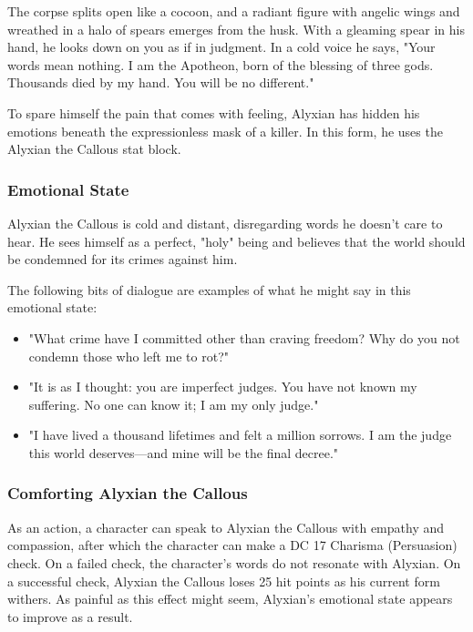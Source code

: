 \documentclass[10pt,a4paper,twoside,fancy,bg=print,twocolumn,openany,nodeprecatedcode]{dndbook}
\begin{document}
\begin{DndReadAloud}{}
The corpse splits open like a cocoon, and a radiant figure with angelic wings and wreathed in a halo of spears emerges from the husk. With a gleaming spear in his hand, he looks down on you as if in judgment. In a cold voice he says, "Your words mean nothing. I am the Apotheon, born of the blessing of three gods. Thousands died by my hand. You will be no different."

\end{DndReadAloud}

To spare himself the pain that comes with feeling, Alyxian has hidden his emotions beneath the expressionless mask of a killer. In this form, he uses the Alyxian the Callous stat block.

\subsubsection{Emotional State}
Alyxian the Callous is cold and distant, disregarding words he doesn't care to hear. He sees himself as a perfect, "holy" being and believes that the world should be condemned for its crimes against him.

The following bits of dialogue are examples of what he might say in this emotional state:


\begin{itemize}
\item "What crime have I committed other than craving freedom? Why do you not condemn those who left me to rot?"
\item "It is as I thought: you are imperfect judges. You have not known my suffering. No one can know it; I am my only judge."
\item "I have lived a thousand lifetimes and felt a million sorrows. I am the judge this world deserves—and mine will be the final decree."
\end{itemize}

\subsubsection{Comforting Alyxian the Callous}
As an action, a character can speak to Alyxian the Callous with empathy and compassion, after which the character can make a DC 17 Charisma (Persuasion) check. On a failed check, the character's words do not resonate with Alyxian. On a successful check, Alyxian the Callous loses 25 hit points as his current form withers. As painful as this effect might seem, Alyxian's emotional state appears to improve as a result.
\end{document}

